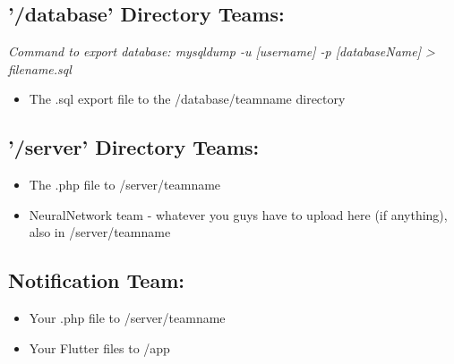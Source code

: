 \documentclass{article}
\begin{document}
\subsection{'/database' Directory Teams:}
\textit{Command to export database: mysqldump -u [username] -p [databaseName] > filename.sql}
\begin{itemize}
    \item The .sql export file to the /database/teamname directory
\end{itemize}

\subsection{'/server' Directory Teams:}
\begin{itemize}
    \item The .php file to /server/teamname
    \item NeuralNetwork team - whatever you guys have to upload here (if anything), also in /server/teamname
\end{itemize}

\subsection{Notification Team:}
\begin{itemize}
    \item Your .php file to /server/teamname
    \item Your Flutter files to /app
\end{itemize}
\end{document}
